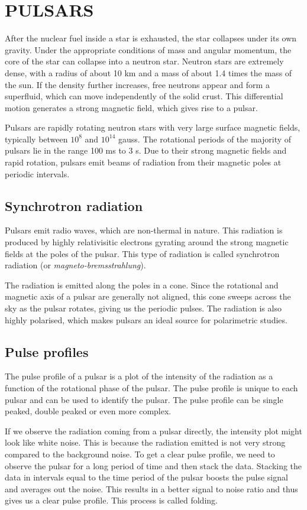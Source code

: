 \documentclass{article_saj}
\begin{document}
\section{PULSARS}
After the nuclear fuel inside a star is exhausted, the star collapses under its own gravity. Under the appropriate conditions of mass and angular momentum, the core of the star can collapse into a neutron star. Neutron stars are extremely dense, with a radius of about 10 km and a mass of about 1.4 times the mass of the sun. If the density further increases, free neutrons appear and form a superfluid, which can move independently of the solid crust. This differential motion generates a strong magnetic field, which gives rise to a pulsar.

Pulsars are rapidly rotating neutron stars with very large surface magnetic fields, typically between $10^8$ and $10^{14}$ gauss. The rotational periods of the majority of pulsars lie in the range 100 ms to 3 s. Due to their strong magnetic fields and rapid rotation, pulsars emit beams of radiation from their magnetic poles at periodic intervals. 

\subsection{Synchrotron radiation}
Pulsars emit radio waves, which are non-thermal in nature. This radiation is produced by highly relativisitic electrons gyrating around the strong magnetic fields at the poles of the pulsar. This type of radiation is called synchrotron radiation (or \textit{magneto-bremsstrahlung}). 

The radiation is emitted along the poles in a cone. Since the rotational and magnetic axis of a pulsar are generally not aligned, this cone sweeps across the sky as the pulsar rotates, giving us the periodic pulses. The radiation is also highly polarised, which makes pulsars an ideal source for polarimetric studies.

\subsection{Pulse profiles}
The pulse profile of a pulsar is a plot of the intensity of the radiation as a function of the rotational phase of the pulsar. The pulse profile is unique to each pulsar and can be used to identify the pulsar. The pulse profile can be single peaked, double peaked or even more complex. 

If we observe the radiation coming from a pulsar directly, the intensity plot might look like white noise. This is because the radiation emitted is not very strong compared to the background noise. To get a clear pulse profile, we need to observe the pulsar for a long period of time and then stack the data. Stacking the data in intervals equal to the time period of the pulsar boosts the pulse signal and averages out the noise. This results in a better signal to noise ratio and thus gives us a clear pulse profile. This process is called folding.
\end{document}
